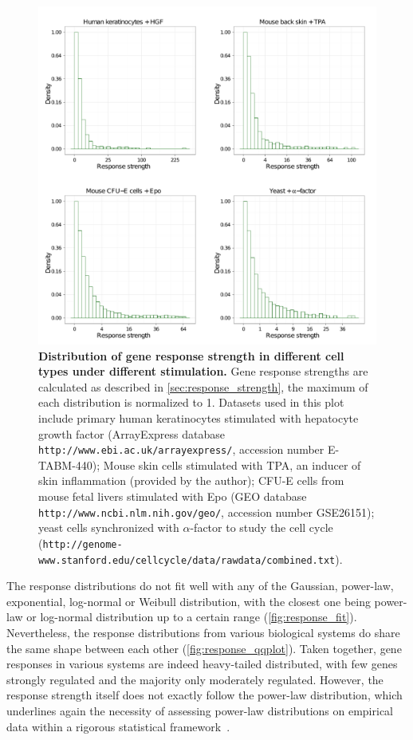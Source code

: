 \begin{figure}[!ht]
\begin{center}
\includegraphics[width=\textwidth]{network/fig/response_all.pdf}
\end{center}
\caption[Heavy-tail distribution of gene response strength]{
{\bf Distribution of gene response strength in different
cell types under different stimulation.}
Gene response strengths are calculated as described in 
\ref{sec:response_strength}, the maximum of each distribution
is normalized to 1. Datasets used in this plot include 
primary human keratinocytes 
stimulated with hepatocyte growth factor (ArrayExpress database 
\texttt{http://www.ebi.ac.uk/arrayexpress/},
accession number E-TABM-440); Mouse skin cells stimulated with TPA,
an inducer of skin inflammation (provided by the author); 
CFU-E cells from mouse fetal livers stimulated
with Epo (GEO database \texttt{http://www.ncbi.nlm.nih.gov/geo/}, accession
number GSE26151); yeast cells synchronized with 
$\alpha$-factor to study the cell cycle
\\(\texttt{http://genome-www.stanford.edu/cellcycle/data/rawdata/combined.txt}).
}
\label{fig:response_strength}
\end{figure}

The response distributions do not fit well with any of the 
Gaussian, power-law, exponential, log-normal or Weibull distribution, with the closest one being power-law or log-normal
distribution up to a certain range (\ref{fig:response_fit}). 
Nevertheless, the response distributions from various 
biological systems do share the same shape between each 
other (\ref{fig:response_qqplot}). Taken together, gene
responses in various systems are indeed heavy-tailed distributed, with few
genes strongly regulated and the majority only moderately
regulated. However, the response strength itself does not exactly 
follow the power-law distribution,
which underlines again the necessity of assessing power-law
distributions on empirical data within a rigorous statistical
framework~\citep{Clauset2009}.

